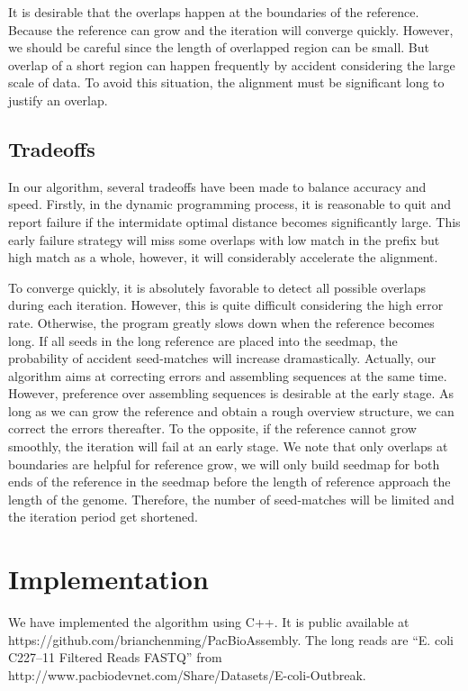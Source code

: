 \documentclass{article}
\begin{document}
It is desirable that the overlaps happen at the boundaries of the reference.
Because the reference can grow and the iteration will converge quickly. However,
        we should be careful since the length of overlapped region can be small.
        But overlap of a short region can happen frequently by accident
        considering the large scale of data. To avoid this situation, the
        alignment must be significant long to justify an overlap.

\subsection{Tradeoffs}

In our algorithm, several tradeoffs have been made to balance accuracy and
speed. Firstly, in the dynamic programming process, it is reasonable to quit and
report failure if the intermidate optimal distance becomes significantly large.
This early failure strategy will miss some overlaps with low match in the prefix
but high match as a whole, however, it will considerably accelerate the
alignment.

To converge quickly, it is absolutely favorable to detect all possible overlaps
during each iteration. However, this is quite difficult considering the high
error rate. Otherwise, the program greatly slows down when the reference becomes
long. If all seeds in the long reference are placed into the seedmap, the
probability of accident seed-matches will increase dramastically. Actually, our
algorithm aims at correcting errors and assembling sequences at the same time.
However, preference over assembling sequences is desirable at the early stage.
As long as we can grow the reference and obtain a rough overview structure, we
can correct the errors thereafter. To the opposite, if the reference cannot grow
smoothly, the iteration will fail at an early stage. We note that only overlaps
at boundaries are helpful for reference grow, we will only build seedmap for
both ends of the reference in the seedmap before the length of reference
approach the length of the genome. Therefore, the number of seed-matches will be
limited and the iteration period get shortened.

\section{Implementation}

We have implemented the algorithm using C++. It is public available at
https://github.com/brianchenming/PacBioAssembly. The long reads are ``E.
coli C227--11 Filtered Reads FASTQ'' from \\ 
http://www.pacbiodevnet.com/Share/Datasets/E-coli-Outbreak. 
\end{document}
